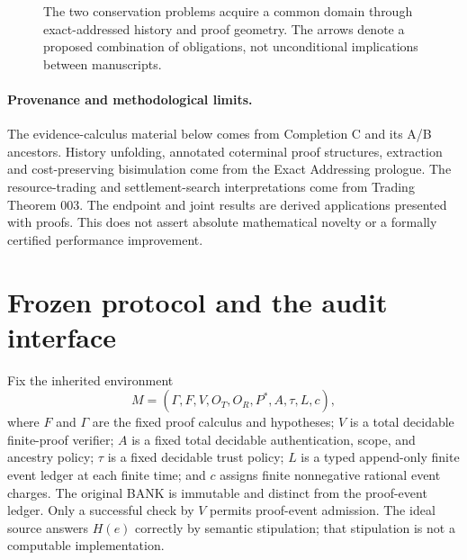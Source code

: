 \documentclass[11pt,letterpaper]{article}
\theoremstyle{definition}
\begin{document}
\begin{figure}[htbp]\centering
{}
\caption{The two conservation problems acquire a common domain through exact-addressed history and proof geometry. The arrows denote a proposed combination of obligations, not unconditional implications between manuscripts.}
\label{fig:integrated-spine}
\end{figure}

\paragraph{Provenance and methodological limits.} The evidence-calculus material below comes from Completion C and its A/B ancestors. History unfolding, annotated coterminal proof structures, extraction and cost-preserving bisimulation come from the Exact Addressing prologue. The resource-trading and settlement-search interpretations come from Trading Theorem 003. The endpoint and joint results are derived applications presented with proofs. This does not assert absolute mathematical novelty or a formally certified performance improvement.
\section{Frozen protocol and the audit interface}
Fix the inherited environment
\[
M=(\Gamma,F,V,O_T,O_R,P^*,A,\tau,L,c),
\]
where $F$ and $\Gamma$ are the fixed proof calculus and hypotheses; $V$ is a total decidable finite-proof verifier; $A$ is a fixed total decidable authentication, scope, and ancestry policy; $\tau$ is a fixed decidable trust policy; $L$ is a typed append-only finite event ledger at each finite time; and $c$ assigns finite nonnegative rational event charges. The original BANK is immutable and distinct from the proof-event ledger. Only a successful check by $V$ permits proof-event admission. The ideal source answers $H(e)$ correctly by semantic stipulation; that stipulation is not a computable implementation.
\end{document}

